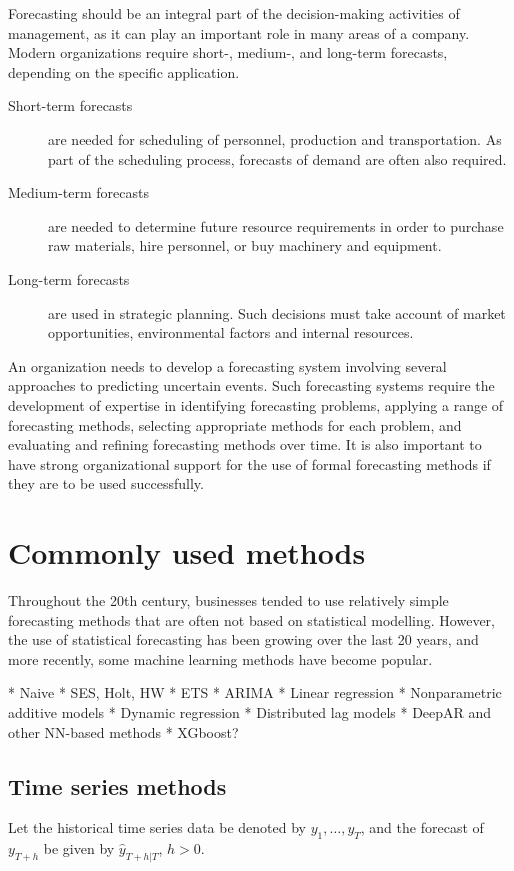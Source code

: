 \documentclass[a4paper,10pt]{article}
\begin{document}
Forecasting should be an integral part of the decision-making activities of management, as it can play an important role in many areas of a company. Modern organizations require short-, medium-, and long-term forecasts, depending on the specific application.
\begin{description}
	\item[Short-term forecasts] are needed for scheduling of personnel, production and transportation. As part of the scheduling process, forecasts of demand are often also required.
	\item[Medium-term forecasts] are needed to determine future resource requirements in order to purchase raw materials, hire personnel, or buy machinery and equipment.
	\item[Long-term forecasts] are used in strategic planning. Such decisions must take account of market opportunities, environmental factors and internal resources.
\end{description}
An organization needs to develop a forecasting system involving several approaches to predicting uncertain events. Such forecasting systems require the development of expertise in identifying forecasting problems, applying a range of forecasting methods, selecting appropriate methods for each problem, and evaluating and refining forecasting methods over time. It is also important to have strong organizational support for the use of formal forecasting methods if they are to be used successfully.


\section{Commonly used methods}

Throughout the 20th century, businesses tended to use relatively simple forecasting methods that are often not based on statistical modelling. However, the use of statistical forecasting has been growing over the last 20 years, and more recently, some machine learning methods have become popular.

* Naive
* SES, Holt, HW
* ETS
* ARIMA
* Linear regression
* Nonparametric additive models
* Dynamic regression
* Distributed lag models
* DeepAR and other NN-based methods
* XGboost?


\subsection*{Time series methods}

Let the historical time series data be denoted by $y_1,\dots,y_T$, and the forecast of $y_{T+h}$ be given by $\hat{y}_{T+h|T}$, $h>0$.
\end{document}
